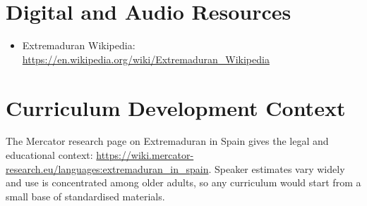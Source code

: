 \documentclass[12pt]{article}
\begin{document}
\section{Digital and Audio Resources}
\begin{itemize}
\item Extremaduran Wikipedia: \url{https://en.wikipedia.org/wiki/Extremaduran_Wikipedia}
\end{itemize}

\section{Curriculum Development Context}
The Mercator research page on Extremaduran in Spain gives the legal and educational context: \url{https://wiki.mercator-research.eu/languages:extremaduran_in_spain}. Speaker estimates vary widely and use is concentrated among older adults, so any curriculum would start from a small base of standardised materials.
\end{document}
